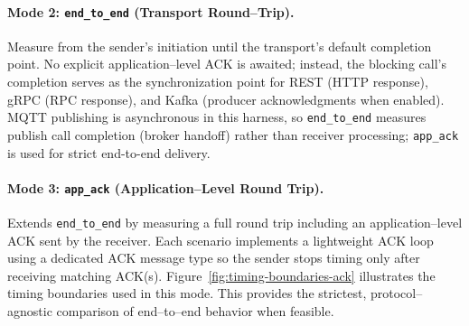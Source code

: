 \paragraph{Mode 2: \texttt{end\_to\_end} (Transport Round--Trip).}
Measure from the sender’s initiation until the transport's default completion point. No explicit application--level ACK is awaited; instead, the blocking call’s completion serves as the synchronization point for REST (HTTP response), gRPC (RPC response), and Kafka (producer acknowledgments when enabled). MQTT publishing is asynchronous in this harness, so \texttt{end\_to\_end} measures publish call completion (broker handoff) rather than receiver processing; \texttt{app\_ack} is used for strict end-to-end delivery.

\paragraph{Mode 3: \texttt{app\_ack} (Application--Level Round Trip).}
Extends \texttt{end\_to\_end} by measuring a full round trip including an application--level ACK sent by the receiver. Each scenario implements a lightweight ACK loop using a dedicated ACK message type so the sender stops timing only after receiving matching ACK(s). Figure~\ref{fig:timing-boundaries-ack} illustrates the timing boundaries used in this mode. This provides the strictest, protocol--agnostic comparison of end--to--end behavior when feasible.

